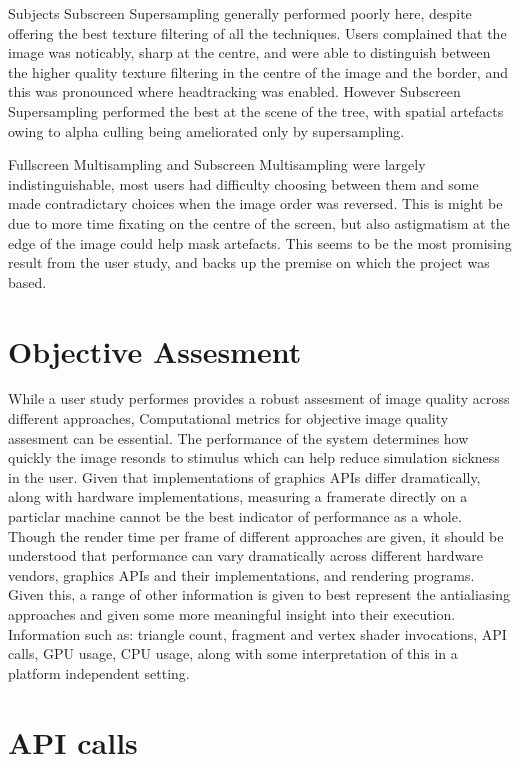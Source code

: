 \documentclass[12pt,a4paper,twoside,openright]{report}
\begin{document}
Subjects Subscreen Supersampling generally performed poorly here, despite offering the best texture filtering of all the techniques. Users complained that the image was noticably, sharp at the centre, and were able to distinguish between the higher quality texture filtering in the centre of the image and the border, and this was pronounced where headtracking was enabled. However Subscreen Supersampling performed the best at the scene of the tree, with spatial artefacts owing to alpha culling being ameliorated only by supersampling.

Fullscreen Multisampling and Subscreen Multisampling were largely indistinguishable, most users had difficulty choosing between them and some made contradictary choices when the image order was reversed. This is might be due to more time fixating on the centre of the screen, but also astigmatism at the edge of the image could help mask artefacts. This seems to be the most promising result from the user study, and backs up the premise on which the project was based.

\section{Objective Assesment}

While a user study performes provides a robust assesment of image quality across different approaches, Computational metrics for objective image quality assesment can be essential. The performance of the system determines how quickly the image resonds to stimulus which can help reduce simulation sickness in the user. Given that implementations of graphics APIs differ dramatically, along with hardware implementations, measuring a framerate directly on a particlar machine cannot be the best indicator of performance as a whole. Though the render time per frame of different approaches are given, it should be understood that performance can vary dramatically across different hardware vendors, graphics APIs and their implementations, and rendering programs. Given this, a range of other information is given to best represent the antialiasing approaches and given some more meaningful insight into their execution. Information such as: triangle count, fragment and vertex shader invocations, API calls, GPU usage, CPU usage, along with some interpretation of this in a platform independent setting.

\section{API calls}
\end{document}
